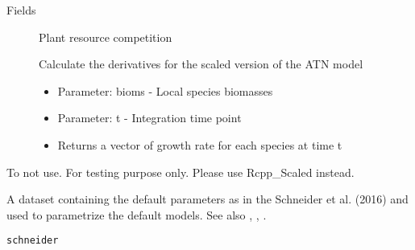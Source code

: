 \documentclass[letterpaper]{book}
\begin{document}
\begin{Section}{Fields}
\begin{description}
\item[] Plant resource competition

\item[] Calculate the derivatives for the scaled version of the ATN model \begin{itemize}

\item{} Parameter: bioms -  Local species biomasses
\item{} Parameter: t - Integration time point
\item{} Returns a vector of growth rate for each species at time t

\end{itemize}


\end{description}
\end{Section}
%
\begin{Description}\relax
To not use. For testing purpose only. Please use Rcpp\_Scaled instead.
\end{Description}
%
\begin{Description}\relax
A dataset containing the default parameters as in the Schneider et al. (2016)
and used to parametrize the default models. See also
, ,
.
\end{Description}
%
\begin{Usage}
\begin{verbatim}
schneider
\end{verbatim}
\end{Usage}
%
\end{document}
